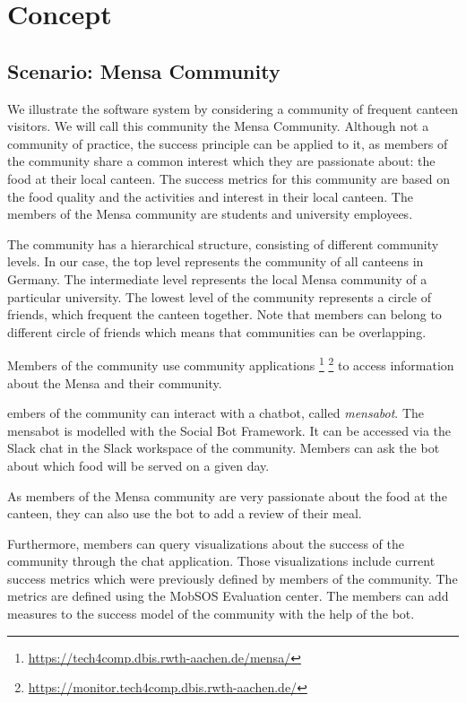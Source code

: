 \chapter{Concept}\label{cha:concept}
\section{Scenario: Mensa Community}
We illustrate the software system by considering a community of frequent canteen visitors. We will call this community the Mensa Community.
Although not a community of practice, the success principle can be applied to it, as members of the community share a common interest which they are passionate about: the food at their local canteen.
The success metrics for this community are based on the food quality and the activities and interest in their local canteen.
The members of the Mensa community are students and university employees.

The community has a hierarchical structure, consisting of different community levels.
In our case, the top level represents the community of all canteens in Germany.
The intermediate level represents the local Mensa community of a particular university.
The lowest level of the community represents a circle of friends, which frequent the canteen together. Note that members can belong to different circle of friends which means that communities can be overlapping.

Members of the community use community applications \footnote{\url{https://tech4comp.dbis.rwth-aachen.de/mensa/}}
\footnote{\url{https://monitor.tech4comp.dbis.rwth-aachen.de/}} to access information about the Mensa and their community.

embers of the community can interact with a chatbot, called \emph{mensabot}. The mensabot is modelled with  the Social Bot Framework. It can be accessed via the Slack chat in the Slack workspace of the community. Members can ask the bot about which food will be served on a given day.

As members of the Mensa community are very passionate about the food at the canteen, they can also use the bot to add a review of their meal.

Furthermore, members can query visualizations about the success of the community through the chat application. Those visualizations include current success metrics which were previously defined by members of the community. The metrics are defined using the MobSOS Evaluation center. The members can add measures to the success model of the community with the help of the bot.

